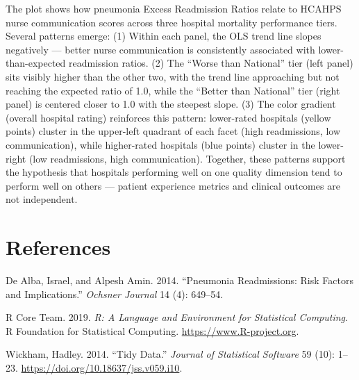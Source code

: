 \documentclass[
]{article}
\newlength{\cslhangindent}
\newenvironment{CSLReferences}[2] %
 {\begin{list}{}{%
  \setlength{\itemindent}{0pt}
  \setlength{\leftmargin}{0pt}
  \setlength{\parsep}{0pt}
  \ifodd #1
   \setlength{\leftmargin}{\cslhangindent}
   \setlength{\itemindent}{-1\cslhangindent}
  \fi
  \setlength{\itemsep}{#2\baselineskip}}}
 {\end{list}}
\begin{document}
The plot shows how pneumonia Excess Readmission Ratios relate to HCAHPS
nurse communication scores across three hospital mortality performance
tiers. Several patterns emerge: (1) Within each panel, the OLS trend
line slopes negatively --- better nurse communication is consistently
associated with lower-than-expected readmission ratios. (2) The ``Worse
than National'' tier (left panel) sits visibly higher than the other
two, with the trend line approaching but not reaching the expected ratio
of 1.0, while the ``Better than National'' tier (right panel) is
centered closer to 1.0 with the steepest slope. (3) The color gradient
(overall hospital rating) reinforces this pattern: lower-rated hospitals
(yellow points) cluster in the upper-left quadrant of each facet (high
readmissions, low communication), while higher-rated hospitals (blue
points) cluster in the lower-right (low readmissions, high
communication). Together, these patterns support the hypothesis that
hospitals performing well on one quality dimension tend to perform well
on others --- patient experience metrics and clinical outcomes are not
independent.

\section*{References}\label{references}

\protect{}\label{refs}
\begin{CSLReferences}{1}{1}
De Alba, Israel, and Alpesh Amin. 2014. {``Pneumonia Readmissions: Risk
Factors and Implications.''} \emph{Ochsner Journal} 14 (4): 649--54.

R Core Team. 2019. \emph{R: A Language and Environment for Statistical
Computing}. R Foundation for Statistical Computing.
\url{https://www.R-project.org}.

Wickham, Hadley. 2014. {``Tidy Data.''} \emph{Journal of Statistical
Software} 59 (10): 1--23. \url{https://doi.org/10.18637/jss.v059.i10}.

\end{CSLReferences}
\end{document}
